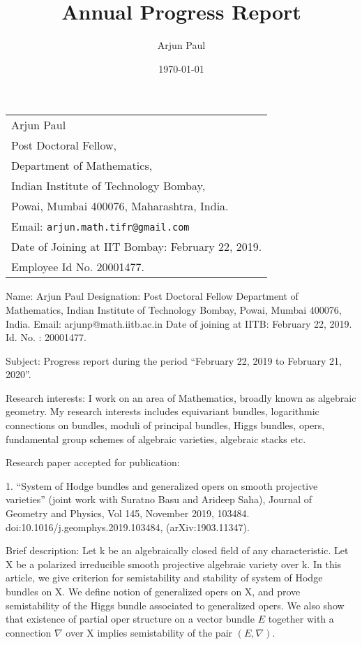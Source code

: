\documentclass[11pt,a4paper,leqno]{article}
\title{Annual Progress Report} %
\author[1]{Arjun Paul}
\date{\today}
\numberwithin{equation}{subsection}
\theoremstyle{definition}
\begin{document}
\maketitle
\begin{tabular}{l}
\hline 
	{Arjun Paul} \\
	\hspace{.1in} Post Doctoral Fellow,\\
	\hspace{.1in} Department of Mathematics,\\
	\hspace{.1in} Indian Institute of Technology Bombay, \\
	\hspace{.1in} Powai, Mumbai 400076, Maharashtra, India. \\
	\hspace{.1in} Email: {\rm \texttt{arjun.math.tifr@gmail.com}} \\ 
	\hspace{.1in} Date of Joining at IIT Bombay: February 22, 2019. \\
	\hspace{.1in} Employee Id No. 20001477. \\
\hline 
\end{tabular}

	Name: Arjun Paul 
	Designation: Post Doctoral Fellow 
	Department of Mathematics, 
	Indian Institute of Technology Bombay, 
	Powai, Mumbai 400076, India. 
	Email: arjunp@math.iitb.ac.in 
	Date of joining at IITB: February 22, 2019. 
	Id. No. : 20001477. 
	
	Subject: Progress report during the period “February 22, 2019 to February 21, 2020”.
	
	Research interests: I work on an area of Mathematics, broadly known as algebraic geometry. My research interests includes equivariant bundles, logarithmic connections on bundles, moduli of principal bundles, Higgs bundles, opers, fundamental group schemes of algebraic varieties, algebraic stacks etc. 
	
	Research paper accepted for publication: 
	
	1. “System of Hodge bundles and generalized opers on smooth projective varieties” (joint work with Suratno Basu and Arideep Saha), Journal of Geometry and Physics, Vol 145, November 2019, 103484. doi:10.1016/j.geomphys.2019.103484, (arXiv:1903.11347).
	
	Brief description: Let k be an algebraically closed field of any characteristic. 
	Let X be a polarized irreducible smooth projective algebraic variety over k. In this article, 
	we give criterion for semistability and stability of system of Hodge bundles on X. We define 
	notion of generalized opers on X, and prove semistability of the Higgs bundle associated to 
	generalized opers. We also show that existence of partial oper structure on a vector bundle $E$ 
	together with a connection $\nabla$ over X implies semistability of the pair $(E, \nabla)$. 
	
\end{document}
